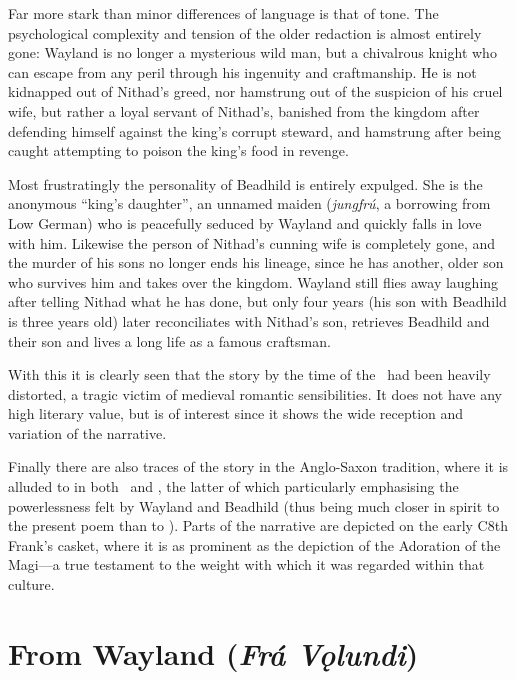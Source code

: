 Far more stark than minor differences of language is that of tone. The psychological complexity and tension of the older redaction is almost entirely gone: Wayland is no longer a mysterious wild man, but a chivalrous knight who can escape from any peril through his ingenuity and craftmanship. He is not kidnapped out of Nithad’s greed, nor hamstrung out of the suspicion of his cruel wife, but rather a loyal servant of Nithad’s, banished from the kingdom after defending himself against the king’s corrupt steward, and hamstrung after being caught attempting to poison the king’s food in revenge.

Most frustratingly the personality of Beadhild is entirely expulged. She is the anonymous “king’s daughter”, an unnamed maiden (\emph{jungfrú}, a borrowing from Low German) who is peacefully seduced by Wayland and quickly falls in love with him. Likewise the person of Nithad’s cunning wife is completely gone, and the murder of his sons no longer ends his lineage, since he has another, older son who survives him and takes over the kingdom. Wayland still flies away laughing after telling Nithad what he has done, but only four years (his son with Beadhild is three years old) later reconciliates with Nithad’s son, retrieves Beadhild and their son and lives a long life as a famous craftsman.

With this it is clearly seen that the story by the time of the \ThidreksSaga\ had been heavily distorted, a tragic victim of medieval romantic sensibilities. It does not have any high literary value, but is of interest since it shows the wide reception and variation of the narrative.

Finally there are also traces of the story in the Anglo-Saxon tradition, where it is alluded to in both \Waldere\ and \Deor, the latter of which particularly emphasising the powerlessness felt by Wayland and Beadhild (thus being much closer in spirit to the present poem than to \ThidreksSaga). Parts of the narrative are depicted on the early C8th Frank’s casket, where it is as prominent as the depiction of the Adoration of the Magi—a true testament to the weight with which it was regarded within that culture.

\sectionline

\section{From Wayland (\emph{Frá Vǫlundi})}


